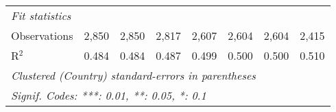 \begin{tabular}{lccccccc}
   \midrule \emph{Fit statistics}\\
   Observations                                                  & 2,850          & 2,850          & 2,817          & 2,607         & 2,604         & 2,604         & 2,415\\  
   R$^2$                                                         & 0.484          & 0.484          & 0.487          & 0.499         & 0.500         & 0.500         & 0.510\\  
   \midrule
   \multicolumn{8}{l}{\emph{Clustered (Country) standard-errors in parentheses}}\\
   \multicolumn{8}{l}{\emph{Signif. Codes: ***: 0.01, **: 0.05, *: 0.1}}\\
\end{tabular}
\par\endgroup


